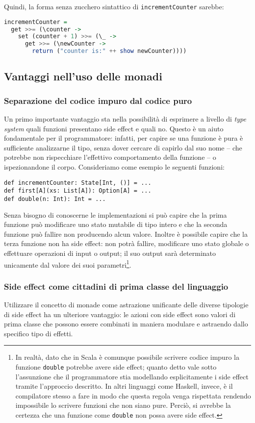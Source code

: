 Quindi, la forma senza zucchero sintattico di \lstinline{incrementCounter} sarebbe:
\begin{lstlisting}[language=haskell]
incrementCounter =
  get >>= (\counter ->
    set (counter + 1) >>= (\_ ->
      get >>= (\newCounter ->
        return ("counter is:" ++ show newCounter))))
\end{lstlisting}


\subsection{Vantaggi nell'uso delle monadi}
\subsubsection{Separazione del codice impuro dal codice puro}
Un primo importante vantaggio sta nella possibilità di esprimere a livello di \emph{type system} quali funzioni presentano side effect e quali no. Questo è un aiuto fondamentale per il programmatore: infatti, per capire se una funzione è pura è sufficiente analizzarne il tipo, senza dover cercare di capirlo dal suo nome -- che potrebbe non rispecchiare l'effettivo comportamento della funzione -- o ispezionandone il corpo.
Consideriamo come esempio le seguenti funzioni:
\begin{lstlisting}[language=scala3]
def incrementCounter: State[Int, ()] = ...
def first[A](xs: List[A]): Option[A] = ...
def double(n: Int): Int = ...
\end{lstlisting}
Senza bisogno di conoscerne le implementazioni si può capire che la prima funzione può modificare uno stato mutabile di tipo intero e che la seconda funzione può fallire non producendo alcun valore. Inoltre è possibile capire che la terza funzione non ha side effect: non potrà fallire, modificare uno stato globale o effettuare operazioni di input o output; il suo output sarà determinato unicamente dal valore dei suoi parametri\footnote{In realtà, dato che in Scala è comunque possibile scrivere codice impuro la funzione \lstinline{double} potrebbe avere side effect; quanto detto vale sotto l'assunzione che il programmatore stia modellando esplicitamente i side effect tramite l'approccio descritto. In altri linguaggi come Haskell, invece, è il compilatore stesso a fare in modo che questa regola venga rispettata rendendo impossibile lo scrivere funzioni che non siano pure. Perciò, si avrebbe la certezza che una funzione come \lstinline{double} non possa avere side effect.}.

\subsubsection{Side effect come cittadini di prima classe del linguaggio}
Utilizzare il concetto di monade come astrazione unificante delle diverse tipologie di side effect ha un ulteriore vantaggio: le azioni con side effect sono valori di prima classe che possono essere combinati in maniera modulare e astraendo dallo specifico tipo di effetti.

